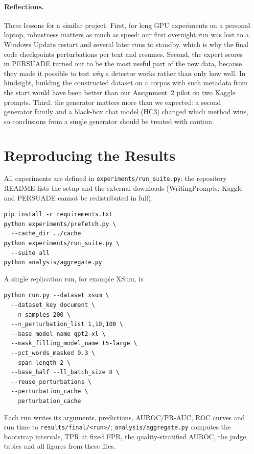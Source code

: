 \documentclass[11pt]{article}
\begin{document}
\paragraph{Reflections.} Three lessons for a similar project. First, for long GPU experiments on a personal laptop, robustness matters as much as speed: our first overnight run was lost to a Windows Update restart and several later runs to standby, which is why the final code checkpoints perturbations per text and resumes. Second, the expert scores in PERSUADE turned out to be the most useful part of the new data, because they made it possible to test \emph{why} a detector works rather than only how well. In hindsight, building the constructed dataset on a corpus with such metadata from the start would have been better than our Assignment~2 pilot on two Kaggle prompts. Third, the generator matters more than we expected: a second generator family and a black-box chat model (HC3) changed which method wins, so conclusions from a single generator should be treated with caution.



\appendix
\section{Reproducing the Results}
\label{app:repro}
All experiments are defined in \texttt{experiments/run\_suite.py}; the repository README lists the setup and the external downloads (WritingPrompts, Kaggle and PERSUADE cannot be redistributed in full).
{\footnotesize
\begin{verbatim}
pip install -r requirements.txt
python experiments/prefetch.py \
  --cache_dir ../cache
python experiments/run_suite.py \
  --suite all
python analysis/aggregate.py
\end{verbatim}}
\noindent A single replication run, for example XSum, is
{\footnotesize
\begin{verbatim}
python run.py --dataset xsum \
  --dataset_key document \
  --n_samples 200 \
  --n_perturbation_list 1,10,100 \
  --base_model_name gpt2-xl \
  --mask_filling_model_name t5-large \
  --pct_words_masked 0.3 \
  --span_length 2 \
  --base_half --ll_batch_size 8 \
  --reuse_perturbations \
  --perturbation_cache \
    perturbation_cache
\end{verbatim}}
\noindent Each run writes its arguments, predictions, AUROC/PR-AUC, ROC curves and run time to \texttt{results/final/<run>/}; \texttt{analysis/aggregate.py} computes the bootstrap intervals, TPR at fixed FPR, the quality-stratified AUROC, the judge tables and all figures from these files.
\end{document}
